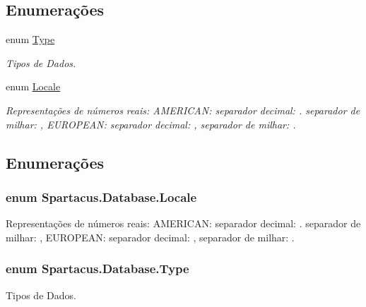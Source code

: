 \subsection*{Enumerações}
\begin{DoxyCompactItemize}
\item 
enum \hyperlink{namespaceSpartacus_1_1Database_a9d4c2be7c9bc257b8d34c84b43e5ec32}{Type} 
\begin{DoxyCompactList}\small\item\em Tipos de Dados. \end{DoxyCompactList}\item 
enum \hyperlink{namespaceSpartacus_1_1Database_a5c77dce887cad55e7ea67f0f98a7d71f}{Locale} 
\begin{DoxyCompactList}\small\item\em Representações de números reais\+: A\+M\+E\+R\+I\+C\+A\+N\+: separador decimal\+: . separador de milhar\+: , E\+U\+R\+O\+P\+E\+A\+N\+: separador decimal\+: , separador de milhar\+: . \end{DoxyCompactList}\end{DoxyCompactItemize}


\subsection{Enumerações}
\hypertarget{namespaceSpartacus_1_1Database_a5c77dce887cad55e7ea67f0f98a7d71f}{
\subsubsection[{Locale}]{\setlength{\rightskip}{0pt plus 5cm}enum {\bf Spartacus.\+Database.\+Locale}}}\label{namespaceSpartacus_1_1Database_a5c77dce887cad55e7ea67f0f98a7d71f}


Representações de números reais\+: A\+M\+E\+R\+I\+C\+A\+N\+: separador decimal\+: . separador de milhar\+: , E\+U\+R\+O\+P\+E\+A\+N\+: separador decimal\+: , separador de milhar\+: . 

\hypertarget{namespaceSpartacus_1_1Database_a9d4c2be7c9bc257b8d34c84b43e5ec32}{
\subsubsection[{Type}]{\setlength{\rightskip}{0pt plus 5cm}enum {\bf Spartacus.\+Database.\+Type}}}\label{namespaceSpartacus_1_1Database_a9d4c2be7c9bc257b8d34c84b43e5ec32}


Tipos de Dados. 

